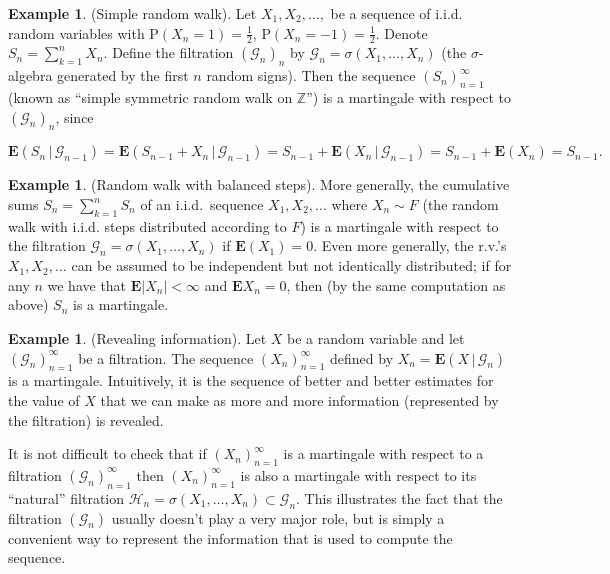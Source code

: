 \documentclass[11pt]{report}
\newcommand{\Z}{\mathbb{Z}}
\theoremstyle{plain}
\theoremstyle{definition}
\newtheorem{example}[thm]{Example}
\begin{document}
\begin{example}
(Simple random walk). Let $X_1, X_2, \ldots,$ be a sequence of i.i.d. random variables with $\mathrm{P}(X_n=1)=\tfrac12$, $\mathrm{P}(X_n=-1)=\tfrac12$. Denote $S_n = \sum_{k=1}^n X_n$. Define the filtration $(\mathcal{G}_n)_n$ by $\mathcal{G}_n = \sigma(X_1,\ldots,X_n)$ (the $\sigma$-algebra generated by the first $n$ random signs). Then the sequence $(S_n)_{n=1}^\infty$ (known as ``simple symmetric random walk on $\Z$'') is a martingale with respect to $(\mathcal{G}_n)_n$, since

\[
\mathbf{E}\left(S_n\,|\,\mathcal{G}_{n-1}\right) = \mathbf{E}\left(S_{n-1}+X_n\,|\,\mathcal{G}_{n-1}\right)
= S_{n-1} + \mathbf{E}\left(X_n\,|\,\mathcal{G}_{n-1}\right) = S_{n-1} + \mathbf{E}(X_n) = S_{n-1}.
\]

\end{example}

\begin{example}
(Random walk with balanced steps). More generally, the cumulative sums $S_n=\sum_{k=1}^n S_n$ of an i.i.d.\ sequence $X_1,X_2,\ldots$ where $X_n\sim F$ (the random walk with i.i.d. steps distributed according to $F$) is a martingale with respect to the filtration $\mathcal{G}_n=\sigma(X_1,\ldots,X_n)$ if $\mathbf{E}(X_1)=0$. Even more generally, the r.v.'s $X_1,X_2,\ldots$ can be assumed to be independent but not identically distributed; if for any $n$ we have that $\mathbf{E}|X_n|<\infty$ and $\mathbf{E} X_n = 0$, then (by the same computation as above) $S_n$ is a martingale.
\end{example}

\begin{example}
(Revealing information). Let $X$ be a random variable and let $(\mathcal{G}_n)_{n=1}^\infty$ be a filtration. The sequence $(X_n)_{n=1}^\infty$ defined by $X_n = \mathbf{E}\left(X\,|\,\mathcal{G}_n\right)$ is a martingale. Intuitively, it is the sequence of better and better estimates for the value of $X$ that we can make as more and more information (represented by the filtration) is revealed.
\end{example}

It is not difficult to check that if $(X_n)_{n=1}^\infty$ is a martingale with respect to a filtration $(\mathcal{G}_n)_{n=1}^\infty$ then $(X_n)_{n=1}^\infty$ is also a martingale with respect to its ``natural'' filtration $\mathcal{H}_n=\sigma(X_1,\ldots,X_n) \subset \mathcal{G}_n$. This illustrates the fact that the filtration $(\mathcal{G}_n)$ usually doesn't play a very major role, but is simply a convenient way to represent the information that is used to compute the sequence.
\end{document}
